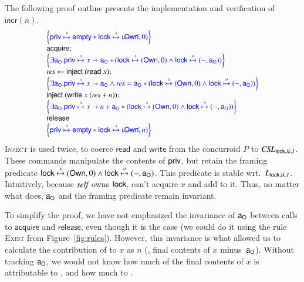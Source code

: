 The following proof outline presents the implementation and
verification of $\mathsf{incr}(n)$.
%
\[
{\small
\begin{array}{l}
\spec{\hpriv \spts \hempty * \hlock \spts (\lockNown, 0)}\\
\mathsf{acquire};\\
\spec{\exists \gE. \hpriv \spts x \hpts \gE \lsep (\hlock \spts
  (\lockOwn, 0) \aand \hlock \opts (-, \gE))}\\
\result \leftarrow \mathsf{inject}\ (\mathsf{read}\ x);\\
\spec{\exists \gE. \hpriv \spts x \hpts \gE \aand \result = \gE \lsep (\hlock \spts
  (\lockOwn, 0) \aand \hlock \opts (-, \gE))}\\
\mathsf{inject}\ (\mathsf{write}\ x\ (\result + n));\\
\spec{\exists \gE. \hpriv \spts x \hpts n + \gE \lsep (\hlock \spts
  (\lockOwn, 0) \aand \hlock \opts (-, \gE))}\\
\mathsf{release}\\
\spec{\hpriv \spts \hempty \lsep \hlock \spts (\lockNown, n)}\\
\end{array}
}\]
%
\textsc{Inject} is used twice, to coerce $\mathsf{read}$ and
$\mathsf{write}$ from the concurroid $P$ to
$\textit{CSL}_{\mathsf{lock},lk,I}$. These commands manipulate the contents of
$\mathsf{priv}$, but retain the framing predicate $\mathsf{lock} \mathrel{\overset{s}{\mapsto}} (\mathsf{Own}, 0)
\wedge \mathsf{lock} \mathrel{\overset{o}{\mapsto}} (-, \mathsf{a}_{{\mathsf{O}}})$.  This predicate is stable
wrt.~$L_{\mathsf{lock},lk,I}$. Intuitively, because $\emph{self}$ owns $\mathsf{lock}$,
\other can't acquire $x$ and add to it. Thus, no matter what \other
does, $\mathsf{a}_{{\mathsf{O}}}$ and the framing predicate remain invariant.


%
To simplify the proof, we have not emphasized the invariance of $\mathsf{a}_{{\mathsf{O}}}$
between calls to $\mathsf{acquire}$ and $\mathsf{release}$, even
though it is the case (we could do it using the rule \textsc{Exist}
from Figure~\ref{fig:rules}). However, this invariance is what allowed
us to calculate the contribution of \self to $x$ as $n$ (\ie, final
contents of $x$ minus~$\mathsf{a}_{{\mathsf{O}}}$). Without tracking $\mathsf{a}_{{\mathsf{O}}}$, we would not
know how much of the final contents of $x$ is attributable to \self,
and how much to \other.

